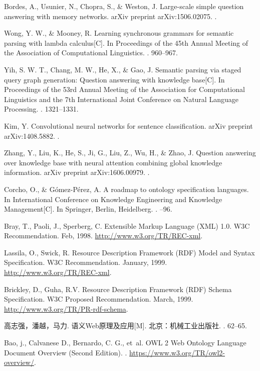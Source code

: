 \begin{thebibliography}{10}
Bordes, A., Usunier, N., Chopra, S., \& Weston, J.
\newblock Large-scale simple question answering with memory networks. arXiv preprint arXiv:1506.02075.
.

Wong, Y. W., \& Mooney, R.
\newblock Learning synchronous grammars for semantic parsing with lambda calculus[C]. In Proceedings of the 45th Annual Meeting of the Association of
Computational Linguistics.
. 960--967.

Yih, S. W. T., Chang, M. W., He, X., \& Gao, J.
\newblock Semantic parsing via staged query graph generation: Question answering with knowledge base[C]. In Proceedings of the 53rd Annual Meeting of the Association for Computational Linguistics and the 7th International Joint Conference on Natural Language Processing.
. 1321--1331.

Kim, Y.
\newblock Convolutional neural networks for sentence classification. arXiv preprint arXiv:1408.5882.
.

Zhang, Y., Liu, K., He, S., Ji, G., Liu, Z., Wu, H., \& Zhao, J.
\newblock Question answering over knowledge base with neural attention combining global knowledge information. arXiv
preprint arXiv:1606.00979.
.

Corcho, O., \& Gómez-Pérez, A.
\newblock A roadmap to ontology specification languages. In International Conference on Knowledge Engineering and Knowledge Management[C].
\newblock In Springer, Berlin, Heidelberg. 
.
--96.

Bray, T., Paoli, J., Sperberg, C.
\newblock Extensible Markup Language (XML) 1.0. W3C Recommendation. Feb, 1998.
\newblock
\url{http://www.w3.org/TR/REC-xml}.

Lassila, O., Swick, R.
\newblock Resource Description Framework (RDF) Model and Syntax Specification. W3C Recommendation. January, 1999.   \url{http://www.w3.org/TR/REC-xml}.

Brickley, D., Guha, R.V. 
\newblock Resource Description Framework (RDF) Schema Specification. W3C Proposed Recommendation. March, 1999.   \url{http://www.w3.org/TR/PR-rdf-schema}.

高志强，潘越，马力.
\newblock 语义Web原理及应用[M].
\newblock 北京：机械工业出版社.
. 62--65.

Bao, j., Calvanese D., Bernardo, C. G., et~al.
\newblock OWL 2 Web Ontology Language Document Overview (Second Edition).
.
\newblock
\url{https://www.w3.org/TR/owl2-overview/}.


\end{thebibliography}
